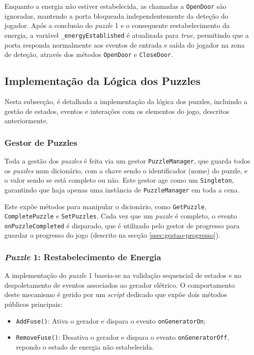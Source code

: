 \documentclass[a4paper, 12pt]{book}
\begin{document}
Enquanto a energia não estiver estabelecida, as chamadas a \texttt{OpenDoor} são ignoradas, mantendo a porta bloqueada 
independentemente da deteção do jogador. Após a conclusão do \textit{puzzle} 1 e o consequente restabelecimento da energia, 
a variável \texttt{\_energyEstablished} é atualizada para \textit{true}, permitindo que a porta responda normalmente 
aos eventos de entrada e saída do jogador na zona de deteção, através dos métodos \texttt{OpenDoor} e \texttt{CloseDoor}.

\subsection{Implementação da Lógica dos Puzzles}
\label{ssec:logica-puzzles}

Nesta subsecção, é detalhada a implementação da lógica dos puzzles, incluindo a gestão de estados, 
eventos e interações com os elementos do jogo, descritos anteriormente.

\subsubsection{Gestor de Puzzles}
\label{ssec:gestao-puzzles}
Toda a gestão dos \textit{puzzles} é feita via um gestor \texttt{PuzzleManager}, que 
guarda todos os \textit{puzzles} num dicionário, com a chave sendo o identificador (nome)
do puzzle, e o valor sendo se está completo ou não. Este gestor age
como um \texttt{Singleton}, garantindo que haja apenas uma instância
de \texttt{PuzzleManager} em toda a cena.

Este expõe métodos para manipular o dicionário, como \texttt{GetPuzzle},
\texttt{CompletePuzzle} e \texttt{SetPuzzles}. Cada vez que um \textit{puzzle} é completo,
o evento \texttt{onPuzzleCompleted} é disparado, que é utilizado pelo
gestor de progresso para guardar o progresso do jogo (descrito na secção \ref{ssec:gestao-progresso}).

\subsubsection{\textit{Puzzle} 1: Restabelecimento de Energia}
\label{sssec:puzzle1}

A implementação do \textit{puzzle} 1 baseia-se na validação sequencial de estados e no despoletamento 
de eventos associados ao gerador elétrico. O comportamento deste mecanismo é gerido por 
um \textit{script} dedicado que expõe dois métodos públicos principais:
\begin{itemize}
    \item \texttt{AddFuse()}: Ativa o gerador e dispara o evento \texttt{onGeneratorOn};
    \item \texttt{RemoveFuse()}: Desativa o gerador e dispara o evento \texttt{onGeneratorOff}, 
    repondo o estado de energia não estabelecida.
\end{itemize}
\end{document}

